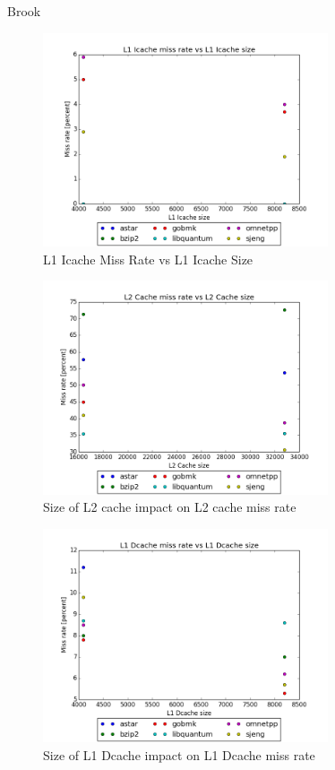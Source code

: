 \documentclass{article}
\begin{document}
Brook

\begin{figure}[ht]
    \centering
    \includegraphics[width=0.75\textwidth]{plots/L1icache_miss_vs_L1icache_size.png}
    \caption{L1 Icache Miss Rate vs L1 Icache Size}
    \label{fig:L1imissvsl1isize}
\end{figure}

\begin{figure}[ht]
    \centering
    \includegraphics[width=0.75\textwidth]{plots/L2cache_miss_vs_size.png}
    \caption{Size of L2 cache impact on L2 cache miss rate}
    \label{fig:l2vsmiss}
\end{figure}

\begin{figure}[ht]
    \centering
    \includegraphics[width=0.75\textwidth]{plots/L1_Dcache_miss_vs_L1_Dcache_size.png}
    \caption{Size of L1 Dcache impact on L1 Dcache miss rate}
    \label{fig:l1vsmiss}
\end{figure}
\end{document}
